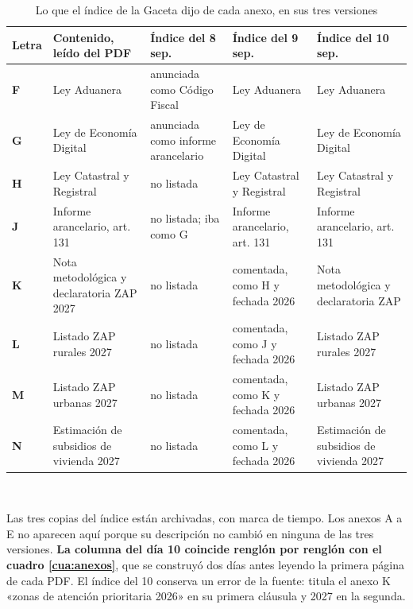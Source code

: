 \begin{table}[htbp]\centering\scriptsize
\caption{Lo que el índice de la Gaceta dijo de cada anexo, en sus tres versiones}\label{cua:convergencia}
\begin{tabular}{l>{\raggedright\arraybackslash}p{3.2cm}>{\raggedright\arraybackslash}p{2.9cm}>{\raggedright\arraybackslash}p{2.9cm}>{\raggedright\arraybackslash}p{2.9cm}}
\toprule
Letra & Contenido, leído del PDF & Índice del 8 sep. & Índice del 9 sep. & Índice del 10 sep. \\
\midrule
\textbf{F} & Ley Aduanera & anunciada como Código Fiscal & Ley Aduanera & Ley Aduanera \\
\textbf{G} & Ley de Economía Digital & anunciada como informe arancelario & Ley de Economía Digital & Ley de Economía Digital \\
\textbf{H} & Ley Catastral y Registral & no listada & Ley Catastral y Registral & Ley Catastral y Registral \\
\textbf{J} & Informe arancelario, art. 131 & no listada; iba como G & Informe arancelario, art. 131 & Informe arancelario, art. 131 \\
\textbf{K} & Nota metodológica y declaratoria ZAP 2027 & no listada & comentada, como H y fechada 2026 & Nota metodológica y declaratoria ZAP \\
\textbf{L} & Listado ZAP rurales 2027 & no listada & comentada, como J y fechada 2026 & Listado ZAP rurales 2027 \\
\textbf{M} & Listado ZAP urbanas 2027 & no listada & comentada, como K y fechada 2026 & Listado ZAP urbanas 2027 \\
\textbf{N} & Estimación de subsidios de vivienda 2027 & no listada & comentada, como L y fechada 2026 & Estimación de subsidios de vivienda 2027 \\
\bottomrule
\end{tabular}
\\[2pt]\begin{minipage}{0.92\textwidth}\scriptsize Las tres copias del índice están archivadas, con marca de tiempo. Los anexos A a E no aparecen aquí porque su descripción no cambió en ninguna de las tres versiones. \textbf{La columna del día 10 coincide renglón por renglón con el cuadro \ref{cua:anexos}}, que se construyó dos días antes leyendo la primera página de cada PDF. El índice del 10 conserva un error de la fuente: titula el anexo K «zonas de atención prioritaria 2026» en su primera cláusula y 2027 en la segunda.\end{minipage}
\end{table}
